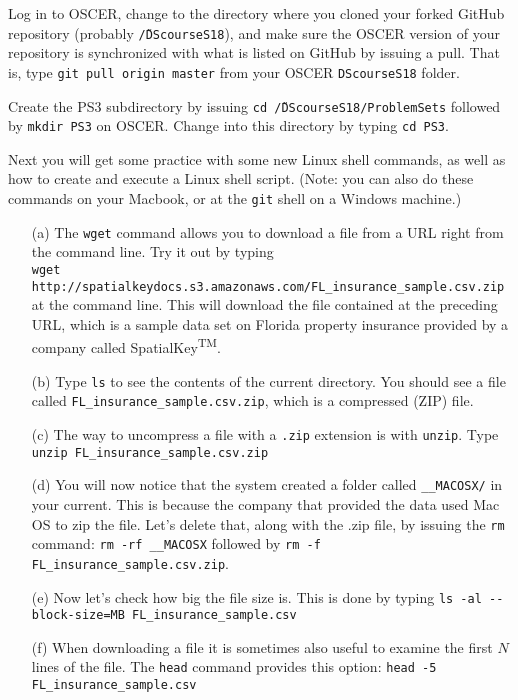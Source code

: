 \documentclass[12pt,english]{exam}
\begin{document}
\begin{questions}
\question Log in to OSCER, change to the directory where you cloned your forked GitHub repository (probably \texttt{\~/DScourseS18}), and make sure the OSCER version of your repository is synchronized with what is listed on GitHub by issuing a pull. That is, type \texttt{git pull origin master} from your OSCER \texttt{DScourseS18} folder. 

\question Create the PS3 subdirectory by issuing \texttt{cd \~/DScourseS18/ProblemSets} followed by \texttt{mkdir PS3} on OSCER. Change into this directory by typing \texttt{cd PS3}.

\question Next you will get some practice with some new Linux shell commands, as well as how to create and execute a Linux shell script. (Note: you can also do these commands on your Macbook, or at the \texttt{git} shell on a Windows machine.)
\begin{itemize}
	\item[(a)] The \texttt{wget} command allows you to download a file from a URL right from the command line. Try it out by typing\\ \texttt{wget http://spatialkeydocs.s3.amazonaws.com/FL\_insurance\_sample.csv.zip} at the command line. This will download the file contained at the preceding URL, which is a sample data set on Florida property insurance provided by a company called SpatialKey\textsuperscript{TM}.
	\item[(b)] Type \texttt{ls} to see the contents of the current directory. You should see a file called \texttt{FL\_insurance\_sample.csv.zip}, which is a compressed (ZIP) file.
	\item[(c)] The way to uncompress a file with a \texttt{.zip} extension is with \texttt{unzip}. Type \texttt{unzip FL\_insurance\_sample.csv.zip}
	\item[(d)] You will now notice that the system created a folder called \texttt{\_\_MACOSX/} in your current. This is because the company that provided the data used Mac OS to zip the file. Let's delete that, along with the .zip file, by issuing the \texttt{rm} command: \texttt{rm -rf \_\_MACOSX} followed by \texttt{rm -f FL\_insurance\_sample.csv.zip}. 
	\item[(e)] Now let's check how big the file size is. This is done by typing \texttt{ls -al -{}-block-size=MB FL\_insurance\_sample.csv}
	\item[(f)] When downloading a file it is sometimes also useful to examine the first $N$ lines of the file. The \texttt{head} command provides this option: \texttt{head -5 FL\_insurance\_sample.csv}

\end{itemize}
\end{questions}
\end{document}
